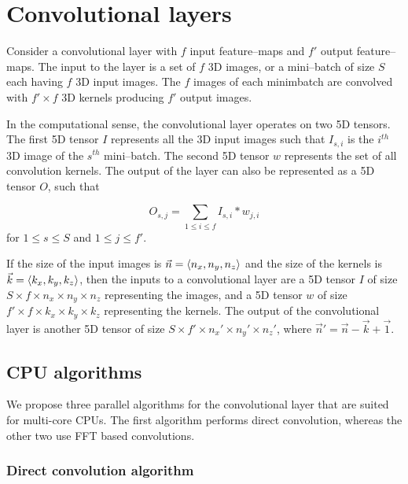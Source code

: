 \documentclass[conference]{IEEEtran}
\DeclarePairedDelimiter{\angled}{\langle}{\rangle}
\begin{document}
\section{Convolutional layers}

  Consider a convolutional layer with $f$ input feature--maps and $f'$
  output feature--maps.  The input to the layer is a set of $f$ 3D
  images, or a mini--batch of size $S$ each having $f$ 3D input
  images.  The $f$ images of each minimbatch are convolved with $f'
  \times f$ 3D kernels producing $f'$ output images.

  In the computational sense, the convolutional layer operates on two
  5D tensors.  The first 5D tensor $I$ represents all the 3D input
  images such that $I_{s,i}$ is the $i^{th}$ 3D image of the $s^{th}$
  mini--batch.  The second 5D tensor $w$ represents the set of all
  convolution kernels.  The output of the layer can also be
  represented as a 5D tensor $O$, such that

  $$O_{s,j} = \sum_{1 \le i \le f} I_{s,i} \ast w_{j,i}$$
  for $1 \le s \le S$ and $1 \le j \le f'$.

  If the size of the input images is $\vec{n} = \angled{n_x, n_y,
  n_z}$ and the size of the kernels is $\vec{k}
  = \angled{k_x,k_y,k_z}$, then the inputs to a convolutional layer
  are a 5D tensor $I$ of size $S \times f \times n_x \times n_y \times
  n_z$ representing the images, and a 5D tensor $w$ of size $f' \times
  f \times k_x \times k_y \times k_z$ representing the kernels.  The
  output of the convolutional layer is another 5D tensor of size
  $S \times f' \times n_x' \times n_y' \times n_z'$, where $\vec{n}'
  = \vec{n} - \vec{k} + \vec{1}$.

\subsection{CPU algorithms}

  We propose three parallel algorithms for the convolutional layer
  that are suited for multi-core CPUs.  The first algorithm performs
  direct convolution, whereas the other two use FFT based
  convolutions.

\subsubsection{Direct convolution algorithm}
\end{document}
